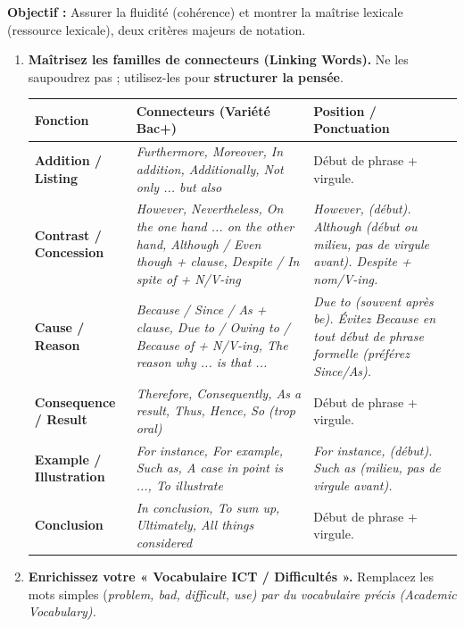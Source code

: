 \documentclass[11pt]{article}
\newcommand{\cle}[1]{{\popxbold\color{popdark}#1}}
\newcommand{\eng}[1]{\ifmmode\text{\textit{#1}}\else\begingroup\selectlanguage{english}\itshape #1\endgroup\fi}
\begin{document}
\begin{methode}
    \textbf{Objectif :} Assurer la fluidité (cohérence) et montrer la maîtrise lexicale (ressource lexicale), deux critères majeurs de notation.
    \begin{enumerate}
        \item \textbf{Maîtrisez les familles de connecteurs (Linking Words).} Ne les saupoudrez pas ; utilisez-les pour \textbf{structurer la pensée}.
            \begin{center}
            \begin{tabularx}{\linewidth}{|l|X|X|}\hline
            \rowcolor{popblueL} \textbf{Fonction} & \textbf{Connecteurs (Variété Bac+)} & \textbf{Position / Ponctuation} \\ \hline
            \textbf{Addition / Listing} & \eng{Furthermore, Moreover, In addition, Additionally, Not only ... but also} & Début de phrase + virgule. \\ \hline
            \textbf{Contrast / Concession} & \eng{However, Nevertheless, On the one hand ... on the other hand, Although / Even though + clause, Despite / In spite of + N/V-ing} & \eng{However,} (début). \eng{Although} (début ou milieu, pas de virgule avant). \eng{Despite} + nom/V-ing. \\ \hline
            \textbf{Cause / Reason} & \eng{Because / Since / As + clause, Due to / Owing to / Because of + N/V-ing, The reason why ... is that ...} & \eng{Due to} (souvent après \eng{be}). Évitez \eng{Because} en tout début de phrase formelle (préférez \eng{Since/As}). \\ \hline
            \textbf{Consequence / Result} & \eng{Therefore, Consequently, As a result, Thus, Hence, So (trop oral)} & Début de phrase + virgule. \\ \hline
            \textbf{Example / Illustration} & \eng{For instance, For example, Such as, A case in point is ..., To illustrate} & \eng{For instance,} (début). \eng{Such as} (milieu, pas de virgule avant). \\ \hline
            \textbf{Conclusion} & \eng{In conclusion, To sum up, Ultimately, All things considered} & Début de phrase + virgule. \\ \hline
            \end{tabularx}
            \end{center}
        \item \textbf{Enrichissez votre « Vocabulaire ICT / Difficultés ».} Remplacez les mots simples (\eng{problem, bad, difficult, use}) par du vocabulaire précis (\cle{Academic Vocabulary}).

\end{enumerate}
\end{methode}
\end{document}
